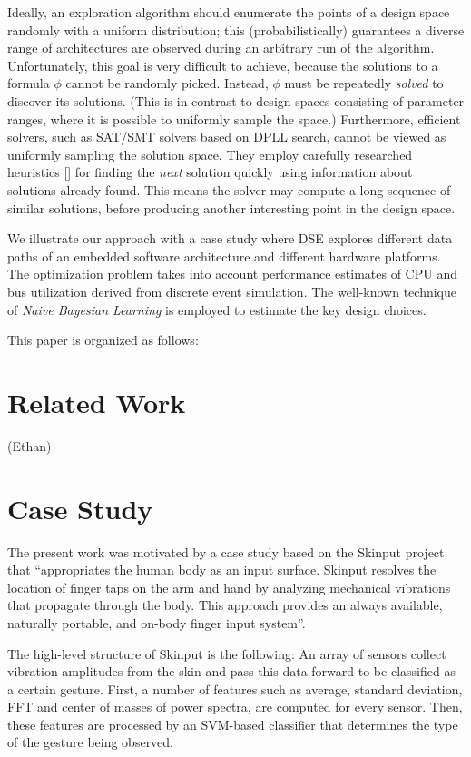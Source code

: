 \documentclass[conference]{IEEEtran}
\begin{document}
Ideally, an exploration algorithm should enumerate the points of a design space randomly with a uniform distribution; this (probabilistically) guarantees a diverse range of architectures are observed during an arbitrary run of the algorithm. Unfortunately, this goal is very difficult to achieve, because the solutions to a formula $\phi$ cannot be randomly picked. Instead, $\phi$ must be repeatedly \textit{solved} to discover its solutions. (This is in contrast to design spaces consisting of parameter ranges, where it is possible to uniformly sample the space.) Furthermore, efficient solvers, such as SAT/SMT solvers based on DPLL search, cannot be viewed as uniformly sampling the solution space. They employ carefully researched heuristics [] for finding the \textit{next} solution quickly using information about solutions already found. This means the solver may compute a long sequence of similar solutions, before producing another interesting point in the design space.


We illustrate our approach with a case study where DSE explores different data paths of an embedded software architecture and different hardware platforms. The optimization problem takes into account performance estimates of CPU and bus utilization derived from discrete event simulation. The well-known technique of \textit{Naive Bayesian Learning} is employed to estimate the key design choices. 

This paper is organized as follows: 

\section{Related Work}
(Ethan)

\section{Case Study}

The present work was motivated by a case study based on the Skinput project \cite{?} that ``appropriates the human body as an input surface. Skinput resolves the location of finger taps on the arm and hand by analyzing mechanical vibrations that propagate through the body. This approach provides an always available, naturally portable, and on-body finger input system''.

The high-level structure of Skinput is the following: An array of sensors collect vibration amplitudes from the skin and pass this data forward to be classified as a certain gesture. First, a number of features such as average, standard deviation, FFT and center of masses of power spectra, are computed for every sensor. Then, these features are processed by an \mbox{SVM-based} classifier that determines the type of the gesture being observed.
\end{document}
